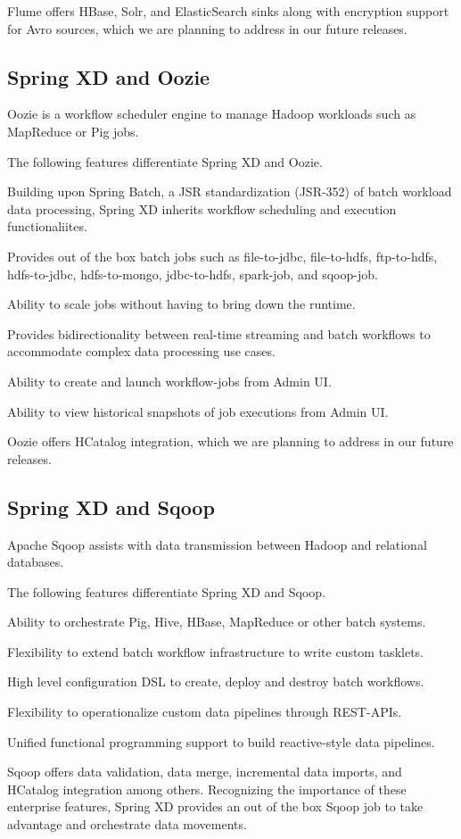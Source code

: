 Flume offers HBase, Solr, and ElasticSearch sinks along with encryption support 
for Avro sources, which we are planning to address in our future releases.

\subsection{Spring XD and Oozie}
Oozie\cite{oozie} is a workflow scheduler engine to manage Hadoop \cite{hadoop} 
workloads such as MapReduce or Pig jobs. 

The following features differentiate Spring XD and Oozie.

\begin{itemize*}
\item Building upon Spring Batch, a JSR standardization (JSR-352) of batch 
workload data processing, Spring XD inherits workflow scheduling and execution 
functionaliites.
\item Provides out of the box batch jobs such as file-to-jdbc, file-to-hdfs, 
ftp-to-hdfs, hdfs-to-jdbc, hdfs-to-mongo, jdbc-to-hdfs, spark-job, and sqoop-job.
\item Ability to scale jobs without having to bring down the runtime.
\item Provides bidirectionality between real-time streaming and batch 
workflows to accommodate complex data processing use cases.
\item Ability to create and launch workflow-jobs from Admin UI. 
\item Ability to view historical snapshots of job executions from Admin UI.
\end{itemize*}

Oozie offers HCatalog integration, which we are planning to address in our 
future releases.

\subsection{Spring XD and Sqoop}
Apache Sqoop\cite{sqoop} assists with data transmission between Hadoop and relational 
databases.

The following features differentiate Spring XD and Sqoop.

\begin{itemize*}
\item Ability to orchestrate Pig, Hive, HBase, MapReduce or other batch systems.
\item Flexibility to extend batch workflow infrastructure to write custom tasklets.
\item High level configuration DSL to create, deploy and destroy batch workflows.
\item Flexibility to operationalize custom data pipelines through REST-APIs.
\item Unified functional programming support to build reactive-style data pipelines.
\end{itemize*}

Sqoop offers data validation, data merge, incremental data imports, and HCatalog 
integration among others. Recognizing the importance of these enterprise features, 
Spring XD provides an out of the box Sqoop job to take advantage and orchestrate 
data movements.